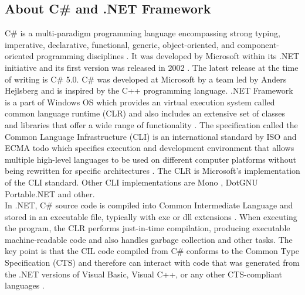 \subsection{About C\# and .NET Framework}
C\# is a multi-paradigm programming language encompassing strong typing, imperative, declarative, functional, generic, object-oriented, and component-oriented programming disciplines \cite{cs1.0specs}. It was developed by Microsoft within its .NET initiative and its first version was released in 2002 \cite{cs1.0specs}. The latest release at the time of writing is C\# 5.0.
C\# was developed at Microsoft by a team led by Anders Hejlsberg and is inspired by the C++ programming language. .NET Framework is a part of Windows OS which provides an virtual execution system called common language runtime (CLR) and also includes an extensive set of classes and libraries that offer a wide range of functionality \cite{csAndDotNet}. The specification called the Common Language Infrastructure (CLI) is an international standard by ISO and ECMA todo which specifies execution and development environment that allows multiple high-level languages to be used on different computer platforms without being rewritten for specific architectures \cite{csAndDotNet}. The CLR is Microsoft's implementation of the CLI standard. Other CLI implementations are Mono \cite{mono}, DotGNU Portable.NET \cite{dotgnu} and other.\\
In .NET, C\# source code is compiled into Common Intermediate Language and stored in an executable file, typically with exe or dll extensions \cite{csAndDotNet}. When executing the program, the CLR performs just-in-time compilation, producing executable machine-readable code and also handles garbage collection and other tasks. The key point is that the CIL code compiled from C\# conforms to the Common Type Specification (CTS) and therefore can interact with code that was generated from the .NET versions of Visual Basic, Visual C++, or any other CTS-compliant languages \cite{csAndDotNet}.


